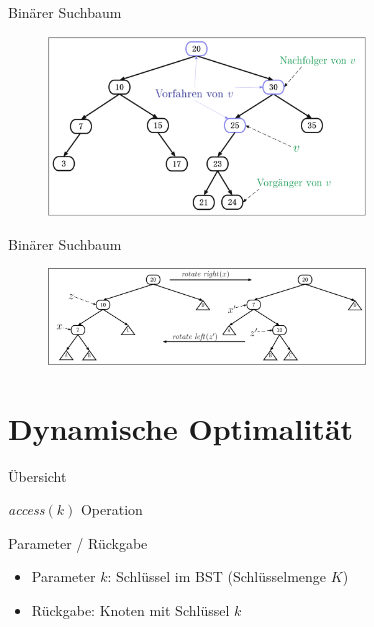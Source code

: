 \documentclass[11pt]{beamer}
\begin{document}
			\begin{frame} {Binärer Suchbaum}
			\begin{figure}[h]
				\centering
				\includegraphics[width=0.75\textwidth]{"Medien/pres/VorgaengerNachfolger"}
			\end{figure}    
		\end{frame}
	
	\begin{frame} {Binärer Suchbaum}
			\begin{figure}[h]
				\centering
				\includegraphics[width=0.75\textwidth]{"Medien/pres/LinksRechtsRotation"}
			\end{figure}    
		\end{frame}	
	
	\section{Dynamische Optimalität}
	
		\begin{frame} {Übersicht}
			\tableofcontents[currentsection]   
		\end{frame}
	
	   
    
    
  \begin{frame} {	\textit{access}$\left(k\right)$ Operation}
    \begin{block}{Parameter / Rückgabe}
    	\begin{itemize}
    		\item Parameter $k$: Schlüssel im BST (Schlüsselmenge $K$)
    		\item Rückgabe: Knoten mit Schlüssel $k$
      \end{itemize}
    			
    \end{block}	
  \end{frame}	
     
\end{document}
